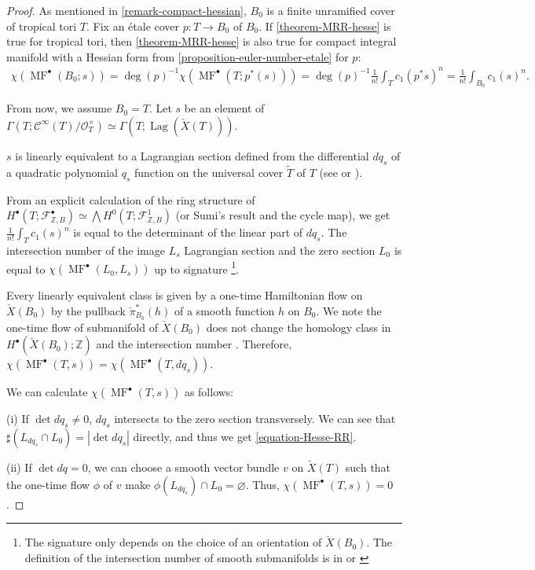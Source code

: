 \documentclass[a4paper,dvipdfmx,reqno,12pt]{amsart}
\theoremstyle{definition}
\newcommand{\emp}{\varnothing}%
\newcommand{\Z}{\mathbb{Z}}%
\newcommand{\mcal}[1]{\mathcal{#1}}%
\newcommand{\opn}[1]{\operatorname{#1}}
\newcommand{\myfootnote}[1]{\hspace{-5pt}\footnote{#1}}
\numberwithin{equation}{section}
\begin{document}
\begin{proof}

As mentioned in \cref{remark-compact-hessian},
$B_0$ is a finite unramified cover of tropical tori $T$.
Fix an \'etale cover $p:T \to B_0$ of $B_0$.
If \cref{theorem-MRR-hesse} is true for tropical tori,
then \cref{theorem-MRR-hesse} is also true for compact
integral manifold with a Hessian form from
\cref{proposition-euler-number-etale} for $p$:
\begin{align}
\chi(\opn{MF}^{\bullet}(B_0;s))
=\opn{deg}(p)^{-1}\chi(\opn{MF}^{\bullet}(T;p^{*}(s)))
=\opn{deg}(p)^{-1}\frac{1}{n!}\int_T c_1(p^{*}s)^{n}
=\frac{1}{n!}\int_{B_0}c_1(s)^{n}.
\end{align}

From now, we assume $B_0=T$.
Let $s$ be an element of 
$\Gamma(T;\mcal{C}^{\infty}(T)/\mcal{O}_{T}^{\times})\simeq
\Gamma(T;\opn{Lag}(\check{X}(T)))$.

$s$ is linearly equivalent to a Lagrangian section
defined from the differential $dq_s$ of a quadratic polynomial
$q_s$ function on the universal cover $\tilde{T}$ of $T$
(see \cite{mikhalkinTropicalCurvesTheir2008a} or 
\cite[3.3]{MR4229604}).

From an explicit calculation of the ring structure of
$H^{\bullet}(T;\mathcal{F}_{\mathbb{Z},B}^{\bullet})
\simeq \bigwedge H^{0}(T;\mathcal{F}_{\mathbb{Z},B}^{1})$
(or Sumi's result
\cite[Theorem 47]{MR4229604} and the cycle map), 
we get 
$\frac{1}{n!}\int_{T}c_1(s)^{n}$ is equal to the determinant
of the linear part of $dq_s$. The intersection number of the image $L_s$ Lagrangian
section and the zero section $L_0$ is equal to
$\chi(\opn{MF}^{\bullet}(L_0,L_s))$ up to 
signature
\myfootnote{The signature only depends on
the choice of 
an orientation of $\check{X}(B_0)$. 
The definition of the intersection number of smooth 
submanifolds is in \cite[5.2]{MR1336822} or 
\cite[0.4]{griffithsPrinciplesAlgebraicGeometry1994a}}. 

Every linearly equivalent 
class is given by a one-time Hamiltonian flow on 
$\check{X}(B_0)$ by the pullback $\check{\pi}_{B_0}^{*}(h)$
of a smooth function $h$ on $B_0$.
We note the one-time flow of submanifold of $\check{X}(B_0)$ does not change
the homology class in $H^{\bullet}(\check{X}(B_0);\Z)$ and
the intersection number \cite[5.2.1. Theorem]{MR1336822}.
Therefore, 
$\chi(\opn{MF}^{\bullet}(T,s))=
\chi(\opn{MF}^{\bullet}(T,dq_{s}))$.

We can calculate $\chi(\opn{MF}^{\bullet}(T,s))$ as follows:

(i) If $\det dq_s\ne 0$, $dq_s$ intersects to 
the zero section transversely. We can see that 
$\sharp(L_{dq_s}\cap L_0)=|\det dq_s|$ directly, and thus
we get \cref{equation-Hesse-RR}. 

(ii) If $\det dq=0$, we can choose a smooth vector bundle $v$ on 
$\check{X}(T)$ such that the one-time flow $\phi$ of $v$ make 
$\phi(L_{dq_s})\cap L_0=\emp$. 
Thus, $\chi(\opn{MF}^{\bullet}(T,s))=0$.
\end{proof}
\end{document}
